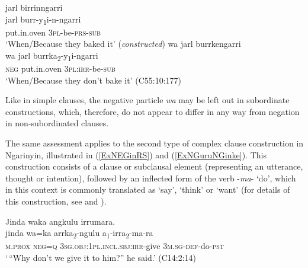 \documentclass[output=paper,colorlinks,citecolor=brown]{langscibook}
\begin{document}
\begin{exe}
\ex
\begin{xlist}
\ex \label{ExNEGinSUB-positiveVersion}
\glll jarl birrinngarri\\
jarl burr-y\textsubscript{1}i-n-ngarri\\
put.in.oven 3\textsc{pl}-be-\textsc{prs}-\textsc{sub}\\
\trans `When/Because they baked it' (\textit{constructed})
\ex \label{ExNEGinSUB}
\glll wa jarl burrkengarri\\
wa jarl burrka\textsubscript{2}-y\textsubscript{1}i-ngarri\\
\textsc{neg} put.in.oven 3\textsc{pl}:\textsc{irr}-be-\textsc{sub}\\
\trans `When/Because they don't bake it' (C55:10:177)
\end{xlist}
\end{exe}

Like in simple clauses, the negative particle \textit{wa} may be left out in subordinate constructions, which, therefore, do not appear to differ in any way from negation in non-subordinated clauses.

The same assessment applies to the second type of complex clause construction in Ngarinyin, illustrated in (\ref{ExNEGinRS}) and (\ref{ExNGuruNGinke}). This construction consists of a clause or subclausal element (representing an utterance, thought or intention), followed by an inflected form of the verb -\textit{ma}- `do', which in this context is commonly translated as `say', `think' or `want' (for details of this construction, see \citealp[157--166]{Rumsey1982} and \citealp{Spronck2015}).

\begin{exe}%
\ex \label{ExNEGinRS}
\glll {\ob}{\ob}Jinda waka angkulu{\cb} irrumara.{\cb}\\
{\db}{\db}jinda wa=ka arrka\textsubscript{2}-ngulu a\textsubscript{1}-irra\textsubscript{2}-ma-ra\\
{\db}{\db}\textsc{m.prox} \textsc{neg=q} 3\textsc{sg.obj:1pl.incl.sbj:irr}-give 3\textsc{m.sg}-\textsc{def}-do-\textsc{pst}\\
\trans `\,``Why don't we give it to him?'' he said.' (C14:2:14) 
\end{exe}
\end{document}
